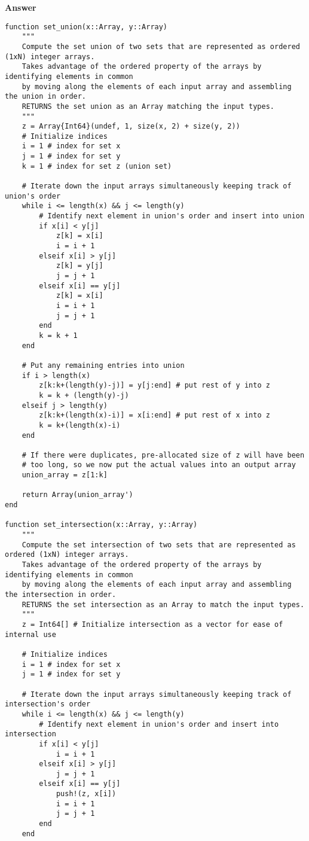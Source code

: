 \documentclass{article}
\begin{document}
\textbf{Answer} 
\begin{verbatim}
function set_union(x::Array, y::Array)
    """
    Compute the set union of two sets that are represented as ordered (1xN) integer arrays.
    Takes advantage of the ordered property of the arrays by identifying elements in common
    by moving along the elements of each input array and assembling the union in order. 
    RETURNS the set union as an Array matching the input types.
    """
    z = Array{Int64}(undef, 1, size(x, 2) + size(y, 2))
    # Initialize indices
    i = 1 # index for set x
    j = 1 # index for set y
    k = 1 # index for set z (union set)

    # Iterate down the input arrays simultaneously keeping track of union's order
    while i <= length(x) && j <= length(y)
        # Identify next element in union's order and insert into union
        if x[i] < y[j]
            z[k] = x[i]
            i = i + 1
        elseif x[i] > y[j]
            z[k] = y[j]
            j = j + 1
        elseif x[i] == y[j]
            z[k] = x[i]
            i = i + 1
            j = j + 1
        end
        k = k + 1
    end
    
    # Put any remaining entries into union
    if i > length(x)
        z[k:k+(length(y)-j)] = y[j:end] # put rest of y into z
        k = k + (length(y)-j)
    elseif j > length(y)
        z[k:k+(length(x)-i)] = x[i:end] # put rest of x into z
        k = k+(length(x)-i)
    end

    # If there were duplicates, pre-allocated size of z will have been 
    # too long, so we now put the actual values into an output array
    union_array = z[1:k]

    return Array(union_array')
end

function set_intersection(x::Array, y::Array)
    """
    Compute the set intersection of two sets that are represented as ordered (1xN) integer arrays.
    Takes advantage of the ordered property of the arrays by identifying elements in common
    by moving along the elements of each input array and assembling the intersection in order. 
    RETURNS the set intersection as an Array to match the input types.
    """
    z = Int64[] # Initialize intersection as a vector for ease of internal use

    # Initialize indices
    i = 1 # index for set x
    j = 1 # index for set y

    # Iterate down the input arrays simultaneously keeping track of intersection's order
    while i <= length(x) && j <= length(y)
        # Identify next element in union's order and insert into intersection
        if x[i] < y[j]
            i = i + 1
        elseif x[i] > y[j]
            j = j + 1
        elseif x[i] == y[j]
            push!(z, x[i])
            i = i + 1
            j = j + 1
        end
    end


\end{verbatim}
\end{document}
